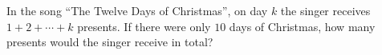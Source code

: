 In the song ``The Twelve Days of Christmas'', on day $k$ the singer receives $1+2+\cdots+k$ presents. If there were only $10$ days of Christmas, how many presents would the singer receive in total?
